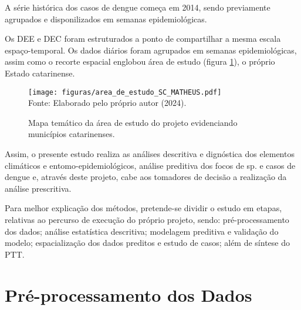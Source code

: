 \indent A série histórica dos casos de dengue começa em 2014, sendo previamente agrupados e disponilizados em semanas epidemiológicas.

\indent Os \acrshort{DEE} e \acrshort{DEC} foram estruturados a ponto de compartilhar a mesma escala espaço-temporal. Os dados diários foram agrupados em semanas epidemiológicas, assim como o recorte espacial englobou área de estudo (figura \ref{fig:area_de_estudo}), o próprio Estado catarinense.

\begin{figure}[h]
    \centering
    \caption{Mapa temático da área de estudo do projeto evidenciando municípios catarinenses.}
    \texttt{[image: figuras/area\_de\_estudo\_SC\_MATHEUS.pdf]}
    \label{fig:area_de_estudo}
    \\
    \vspace{-0.05cm}\hspace{-7.5cm}\small{Fonte: Elaborado pelo próprio autor (2024).} 
\end{figure}

\indent Assim, o presente estudo realiza as análises descritiva e dignóstica dos elementos climáticos e entomo-epidemiológicos,  análise preditiva dos focos de  sp. e casos de dengue e, através deste projeto, cabe aos tomadores de decisão a realização da análise prescritiva.

\indent Para melhor explicação dos métodos, pretende-se dividir o estudo em etapas, relativas ao percurso de execução do próprio projeto, sendo: pré-processamento dos dados; análise estatística descritiva; modelagem preditiva e validação do modelo; espacialização dos dados preditos e estudo de casos; além de síntese do \acrfull{PTT}.


\section{Pré-processamento dos Dados}

